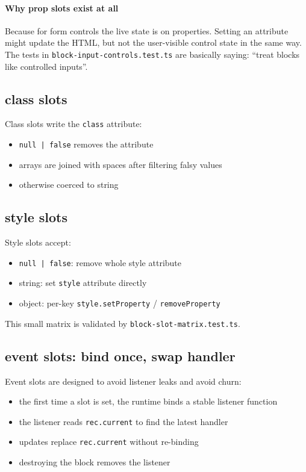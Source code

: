 \paragraph{Why prop slots exist at all}

Because for form controls the live state is on properties.
Setting an attribute might update the HTML, but not the user-visible control state in the same way.
The tests in \texttt{block-input-controls.test.ts} are basically saying: ``treat blocks like controlled inputs''.

\subsection{class slots}

Class slots write the \texttt{class} attribute:

\begin{itemize}
  \item \texttt{null | false} removes the attribute
  \item arrays are joined with spaces after filtering falsy values
  \item otherwise coerced to string
\end{itemize}

\subsection{style slots}

Style slots accept:

\begin{itemize}
  \item \texttt{null | false}: remove whole style attribute
  \item string: set \texttt{style} attribute directly
  \item object: per-key \texttt{style.setProperty} / \texttt{removeProperty}
\end{itemize}

This small matrix is validated by \texttt{block-slot-matrix.test.ts}.

\subsection{event slots: bind once, swap handler}

Event slots are designed to avoid listener leaks and avoid churn:

\begin{itemize}
  \item the first time a slot is set, the runtime binds a stable listener function
  \item the listener reads \texttt{rec.current} to find the latest handler
  \item updates replace \texttt{rec.current} without re-binding
  \item destroying the block removes the listener
\end{itemize}

